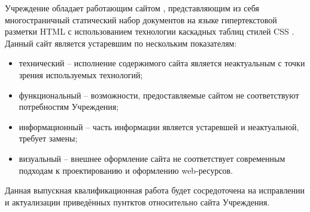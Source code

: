 Учреждение обладает работающим сайтом \cite{uc-meson}, представляющим из себя многостраничный статический набор документов на языке гипертекстовой разметки HTML \cite{wiki-html} с использованием технологии каскадных таблиц стилей CSS \cite{wiki-css}. 
Данный сайт является устаревшим по нескольким показателям:
\begin{itemize}
    \item технический -- исполнение содержимого сайта является неактуальным с точки зрения используемых технологий;
    \item функциональный -- возможности, предоставляемые сайтом не соответствуют потребностям Учреждения;
    \item информационный -- часть информации является устаревшей и неактуальной, требует замены;
    \item визуальный -- внешнее оформление сайта не соответствует современным подходам к проектированию и оформлению web-ресурсов.
\end{itemize}

Данная выпускная квалификационная работа будет сосредоточена на исправлении и актуализации приведённых пунтктов относительно сайта Учреждения.



\clearpage